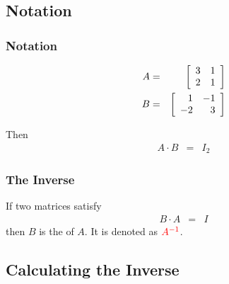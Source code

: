 \subsection{Notation}

\begin{frame}
  \frametitle{Notation}

  \begin{eqnarray*}
    A & = & \left[ \begin{array}{rr} 3 & 1 \\ 2 & 1 \end{array} \right] \\
    B & = & \left[ \begin{array}{rr} 1 & -1 \\ -2 & 3 \end{array} \right]
  \end{eqnarray*}

  Then
  \begin{eqnarray*}
    A\cdot B & = & I_2
  \end{eqnarray*}

\end{frame}


\begin{frame}
  \frametitle{The Inverse}

  \begin{definition}

    If two matrices satisfy
    \begin{eqnarray*}
      B\cdot A & = & I
    \end{eqnarray*}
    then $B$ is the \textit{} of $A$.
    It is denoted as ${\color{red}A^{-1}}$.
  \end{definition}

  \vfill

  \vfill
\end{frame}

\subsection{Calculating the Inverse}

